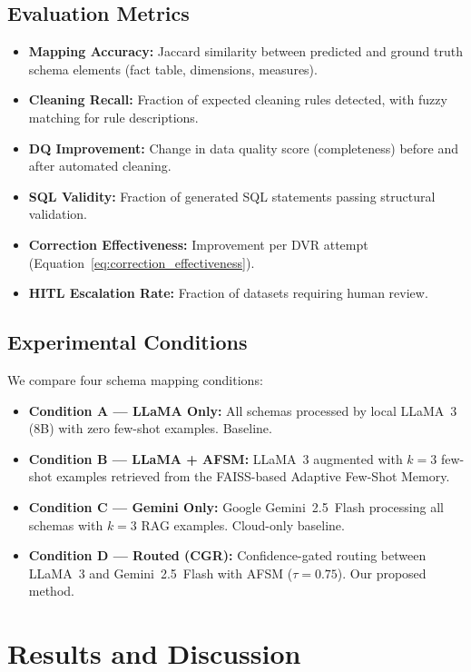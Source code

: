 \documentclass[conference]{IEEEtran}
\begin{document}
\subsection{Evaluation Metrics}

\begin{itemize}
\item \textbf{Mapping Accuracy:} Jaccard similarity between predicted
and ground truth schema elements (fact table, dimensions, measures).
\item \textbf{Cleaning Recall:} Fraction of expected cleaning rules
detected, with fuzzy matching for rule descriptions.
\item \textbf{DQ Improvement:} Change in data quality score (completeness)
before and after automated cleaning.
\item \textbf{SQL Validity:} Fraction of generated SQL statements passing
structural validation.
\item \textbf{Correction Effectiveness:} Improvement per DVR attempt
(Equation~\ref{eq:correction_effectiveness}).
\item \textbf{HITL Escalation Rate:} Fraction of datasets requiring human
review.
\end{itemize}

\subsection{Experimental Conditions}

We compare four schema mapping conditions:
\begin{itemize}
\item \textbf{Condition A — LLaMA Only:} All schemas processed by local
LLaMA~3 (8B) with zero few-shot examples. Baseline.
\item \textbf{Condition B — LLaMA + AFSM:} LLaMA~3 augmented with $k=3$
few-shot examples retrieved from the FAISS-based Adaptive Few-Shot Memory.
\item \textbf{Condition C — Gemini Only:} Google Gemini~2.5~Flash processing
all schemas with $k=3$ RAG examples. Cloud-only baseline.
\item \textbf{Condition D — Routed (CGR):} Confidence-gated routing
between LLaMA~3 and Gemini~2.5~Flash with AFSM ($\tau=0.75$). Our proposed method.
\end{itemize}

\section{Results and Discussion}
\label{sec:results}
\end{document}
